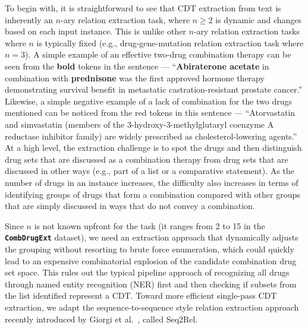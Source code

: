 \documentclass[conference]{IEEEtran}
\begin{document}
To begin with, it is straightforward to see that CDT extraction  from text is inherently an $n$-ary relation extraction task, where $n \geq 2$ is dynamic and changes based on each input instance. This is unlike other $n$-ary relation extraction tasks where $n$ is typically fixed (e.g., drug-gene-mutation relation extraction task where $n=3$). 
A simple example of an effective two-drug combination therapy can be seen from the \textbf{bold} tokens in the sentence --- ``\textbf{Abiraterone acetate} in combination with \textbf{prednisone} was the first approved hormone therapy demonstrating survival benefit in metastatic castration-resistant prostate cancer.'' Likewise, a simple negative example of a lack of combination for the two drugs mentioned can be noticed from the {\color{red}red} tokens in this sentence  --- ``{\color{red}Atorvastatin} and {\color{red}simvastatin} (members of the 3-hydroxy-3-methylglutaryl coenzyme A reductase inhibitor family) are widely prescribed as cholesterol-lowering agents.'' At a high level, the extraction challenge is to spot the drugs and then distinguish drug sets that are discussed as a combination therapy from drug sets that are discussed in other ways (e.g., part of a list or a comparative statement). As the number of drugs in an instance increases, the difficulty also increases in terms of identifying groups of drugs that form a combination compared with other groups that are simply discussed in   ways that do not convey a combination.

Since $n$ is not known upfront for the task (it ranges from 2 to 15 in the \textbf{\texttt{CombDrugExt}} dataset), we need an extraction approach that dynamically adjusts the grouping without resorting to brute force enumeration, which could quickly lead to an expensive combinatorial explosion of the candidate combination drug set space. This rules out the typical pipeline approach of recognizing all drugs through named entity recognition (NER) first and then checking if subsets from the list identified represent a CDT. 
Toward more efficient single-pass CDT extraction,  we adapt the sequence-to-sequence style relation extraction approach recently introduced by Giorgi et al.~\cite{giorgi-etal-2022-sequence}, called Seq2Rel. 
\end{document}
